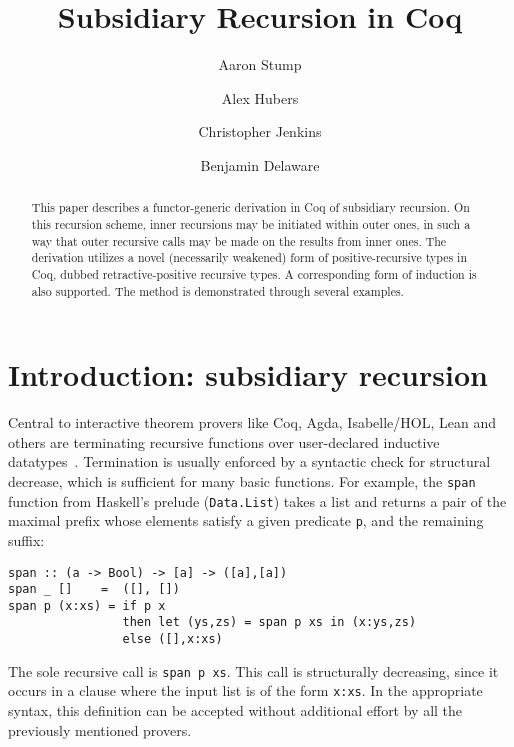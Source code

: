\documentclass[a4paper,USenglish]{lipics-v2021}
\title{Subsidiary Recursion in Coq} %
\author{Aaron Stump}{Computer Science Dept., The University of Iowa, USA \and \url{http://www.cs.uiowa.edu/~astump/}}{aaron-stump@uiowa.edu}{http://orcid.org/0000-0002-9720-0003}{}%
\author{Alex Hubers}{Computer Science, The University of Iowa, USA}{alexander-hubers@uiowa.edu}{}{}
\author{Christopher Jenkins}{Computer Science, The University of Iowa, USA}{alexander-hubers@uiowa.edu}{http://orcid.org/
0000-0002-5434-5018}{}
\author{Benjamin Delaware}{Computer Science, Purdue University, USA \and \url{https://www.cs.purdue.edu/homes/bendy/}}{bendy@purdue.edu}{}{}
\begin{document}
\maketitle

\begin{abstract}
  This paper describes a functor-generic derivation in Coq of
  subsidiary recursion.  On this recursion scheme, inner recursions
  may be initiated within outer ones, in such a way that outer
  recursive calls may be made on the results from inner ones.  The
  derivation utilizes a novel (necessarily weakened) form of
  positive-recursive types in Coq, dubbed retractive-positive
  recursive types.  A corresponding form of induction is also
  supported.  The method is demonstrated through several examples.
\end{abstract}

\section{Introduction: subsidiary recursion}
\label{sec:intro}

Central to interactive theorem provers like Coq, Agda, Isabelle/HOL,
Lean and others are terminating recursive functions over user-declared
inductive datatypes~\cite{agda,coq,isabelle-hol,lean}.  Termination is
usually enforced by a syntactic check for structural decrease, which
is sufficient for many basic functions.  For example, the
\texttt{span} function from Haskell's prelude (\verb|Data.List|) takes
a list and returns a pair of the maximal prefix whose elements satisfy
a given predicate \verb|p|, and the remaining suffix:
\begin{verbatim}
span :: (a -> Bool) -> [a] -> ([a],[a])
span _ []    =  ([], [])
span p (x:xs) = if p x
                then let (ys,zs) = span p xs in (x:ys,zs)
                else ([],x:xs)
\end{verbatim}
\noindent The sole recursive call is \verb|span p xs|. This call is
structurally decreasing, since it occurs in a clause where the input
list is of the form \verb|x:xs|.  In the appropriate syntax, this
definition can be accepted without additional effort by all the
previously mentioned provers.
\end{document}
